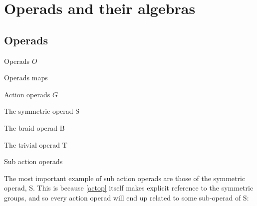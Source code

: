 \chapter{Operads and their algebras}

\section{Operads}

\begin{defn} Operads $O$ \end{defn}

\begin{defn} Operads maps \end{defn}

\cite{ogge} \cite{groupop}

\begin{defn}\label{actop} Action operads $G$ \end{defn}

\begin{example} The symmetric operad $\mathrm{S}$ \end{example}

\begin{example}\label{braidop} The braid operad $\mathrm{B}$ \end{example}

\begin{example} The trivial operad $\mathrm{T}$ \end{example}

\begin{defn} Sub action operads \end{defn}

The most important example of sub action operads are those of the symmetric operad, $\mathrm{S}$. This is because \cref{actop} itself makes explicit reference to the symmetric groups, and so every action operad will end up related to some sub-operad of $\mathrm{S}$:

